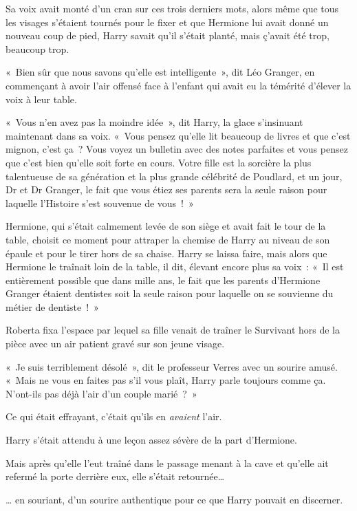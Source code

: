 Sa voix avait monté d'un cran sur ces trois derniers mots, alors même que tous les visages s'étaient tournés pour le fixer et que Hermione lui avait donné un nouveau coup de pied, Harry savait qu'il s'était planté, mais ç'avait été trop, beaucoup trop.

«~Bien sûr que nous savons qu'elle est intelligente~», dit Léo Granger, en commençant à avoir l'air offensé face à l'enfant qui avait eu la témérité d'élever la voix à leur table.

«~Vous n'en avez pas la moindre idée~», dit Harry, la glace s'insinuant maintenant dans sa voix. «~Vous pensez qu'elle lit beaucoup de livres et que c'est mignon, c'est ça~? Vous voyez un bulletin avec des notes parfaites et vous pensez que c'est bien qu'elle soit forte en cours. Votre fille est la sorcière la plus talentueuse de sa génération et la plus grande célébrité de Poudlard, et un jour, Dr et Dr Granger, le fait que vous étiez ses parents sera la seule raison pour laquelle l'Histoire s'est souvenue de vous~!~»

Hermione, qui s'était calmement levée de son siège et avait fait le tour de la table, choisit ce moment pour attraper la chemise de Harry au niveau de son épaule et pour le tirer hors de sa chaise. Harry se laissa faire, mais alors que Hermione le traînait loin de la table, il dit, élevant encore plus sa voix~: «~Il est entièrement possible que dans mille ans, le fait que les parents d'Hermione Granger étaient dentistes soit la seule raison pour laquelle on se souvienne du métier de dentiste~!~»

\later

Roberta fixa l'espace par lequel sa fille venait de traîner le Survivant hors de la pièce avec un air patient gravé sur son jeune visage.

«~Je suis terriblement désolé~», dit le professeur Verres avec un sourire amusé. «~Mais ne vous en faites pas s'il vous plaît, Harry parle toujours comme ça. N'ont-ils pas déjà l'air d'un couple marié~?~»

Ce qui était effrayant, c'était qu'ils en \emph{avaient} l'air.

\later

Harry s'était attendu à une leçon assez sévère de la part d'Hermione.

Mais après qu'elle l'eut traîné dans le passage menant à la cave et qu'elle ait refermé la porte derrière eux, elle s'était retournée…

… en souriant, d'un sourire authentique pour ce que Harry pouvait en discerner.

